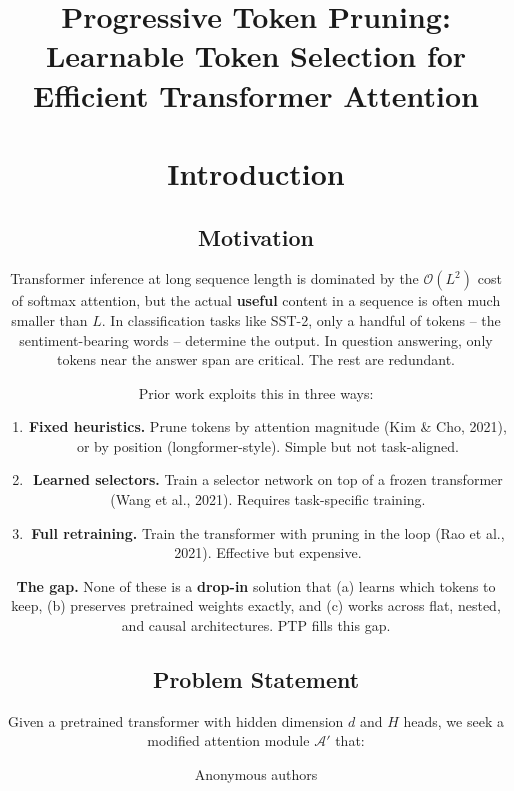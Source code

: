 \title{\textbf{Progressive Token Pruning: Learnable Token Selection for Efficient Transformer Attention}

\author{Anonymous authors}



\section{Introduction}

\subsection{Motivation}

Transformer inference at long sequence length is dominated by the 
$\mathcal{O}(L^2)$ cost of softmax attention, but the actual \textbf{useful} 
content in a sequence is often much smaller than $L$. In classification 
tasks like SST-2, only a handful of tokens -- the sentiment-bearing words -- 
determine the output. In question answering, only tokens near the answer 
span are critical. The rest are redundant.

Prior work exploits this in three ways:

\begin{enumerate}
\item \textbf{Fixed heuristics.} Prune tokens by attention magnitude (Kim \& Cho,
  2021), or by position (longformer-style). Simple but not task-aligned.

\item \textbf{Learned selectors.} Train a selector network on top of a frozen
  transformer (Wang et al., 2021). Requires task-specific training.

\item \textbf{Full retraining.} Train the transformer with pruning in the loop
  (Rao et al., 2021). Effective but expensive.

\end{enumerate}
\textbf{The gap.} None of these is a \textbf{drop-in} solution that (a) learns which 
tokens to keep, (b) preserves pretrained weights exactly, and (c) works 
across flat, nested, and causal architectures. PTP fills this gap.

\subsection{Problem Statement}

Given a pretrained transformer with hidden dimension $d$ and $H$ heads, we 
seek a modified attention module $\mathcal{A}'$ that:

}
